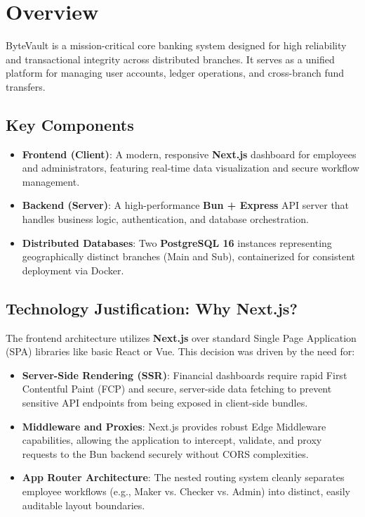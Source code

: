 \section{Overview}
ByteVault is a mission-critical core banking system designed for high reliability and transactional integrity across distributed branches. It serves as a unified platform for managing user accounts, ledger operations, and cross-branch fund transfers.

\subsection{Key Components}
\begin{itemize}
  \item \textbf{Frontend (Client)}: A modern, responsive \textbf{Next.js} dashboard for employees and administrators, featuring real-time data visualization and secure workflow management.
  \item \textbf{Backend (Server)}: A high-performance \textbf{Bun + Express} API server that handles business logic, authentication, and database orchestration.
  \item \textbf{Distributed Databases}: Two \textbf{PostgreSQL 16} instances representing geographically distinct branches (Main and Sub), containerized for consistent deployment via Docker.
\end{itemize}

\subsection{Technology Justification: Why Next.js?}
The frontend architecture utilizes \textbf{Next.js} over standard Single Page Application (SPA) libraries like basic React or Vue. This decision was driven by the need for:
\begin{itemize}
    \item \textbf{Server-Side Rendering (SSR)}: Financial dashboards require rapid First Contentful Paint (FCP) and secure, server-side data fetching to prevent sensitive API endpoints from being exposed in client-side bundles.
    \item \textbf{Middleware and Proxies}: Next.js provides robust Edge Middleware capabilities, allowing the application to intercept, validate, and proxy requests to the Bun backend securely without CORS complexities.
    \item \textbf{App Router Architecture}: The nested routing system cleanly separates employee workflows (e.g., Maker vs. Checker vs. Admin) into distinct, easily auditable layout boundaries.
\end{itemize}


